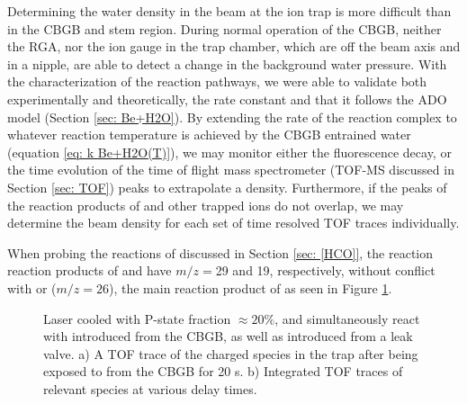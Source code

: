 Determining the water density in the beam at the ion trap is more difficult than in the CBGB and stem region. During normal operation of the CBGB, neither the RGA, nor the ion gauge in the trap chamber, which are off the beam axis and in a nipple, are able to detect a change in the background water pressure. With the characterization of the  reaction pathways, we were able to validate both experimentally and theoretically, the rate constant and that it follows the ADO model (Section \ref{sec: Be+H2O}). By extending the rate of the  reaction complex to whatever reaction temperature is achieved by the CBGB entrained water (equation \ref{eq: k Be+H2O(T)}), we may monitor either the fluorescence decay, or the time evolution of the time of flight mass spectrometer (TOF-MS discussed in Section \ref{sec: TOF}) peaks to extrapolate a  density. Furthermore, if the peaks of the reaction products of  and other trapped ions do not overlap, we may determine the beam density for each set of time resolved TOF traces individually.

When probing the reactions of  discussed in Section \ref{sec: [HCO]}, the reaction reaction products of \ce{[HCO]+} and  have $m/z=$29 and 19, respectively, without conflict with  or  ($m/z=26$), the main reaction product of  as seen in Figure \ref{fig: Be+CO+H2O+CO all traces}.

\begin{figure}[H]
	\centering
	\caption{Laser cooled  with P-state fraction $\approx 20\%$, and  simultaneously react with  introduced from the CBGB, as well as  introduced from a leak valve. a) A TOF trace of the charged species in the trap after being exposed to  from the CBGB for 20 s. b) Integrated TOF traces of relevant species at various delay times.}
	\label{fig: Be+CO+H2O+CO all traces}
\end{figure}

